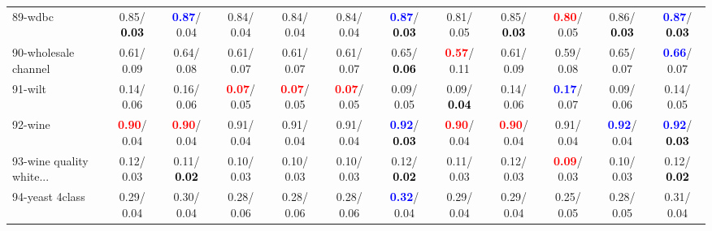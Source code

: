\begin{table}[h]
\begin{center}
{\begin{tabular}{lc|c|c|c|c|c|c|c|c|c|c}
89-wdbc &   0.85/\textcolor{black}{\textbf{  0.03}} & \textcolor{blue}{\textbf{  0.87}}/  0.04 &   0.84/  0.04 &   0.84/  0.04 &   0.84/  0.04 & \textcolor{blue}{\textbf{  0.87}}/\textcolor{black}{\textbf{  0.03}} &   0.81/  0.05 &   0.85/\textcolor{black}{\textbf{  0.03}} & \textcolor{red}{\textbf{  0.80}}/  0.05 &   0.86/\textcolor{black}{\textbf{  0.03}} & \textcolor{blue}{\textbf{  0.87}}/\textcolor{black}{\textbf{  0.03}} \\
90-wholesale channel &   0.61/  0.09 &   0.64/  0.08 &   0.61/  0.07 &   0.61/  0.07 &   0.61/  0.07 &   0.65/\textcolor{black}{\textbf{  0.06}} & \textcolor{red}{\textbf{  0.57}}/  0.11 &   0.61/  0.09 &   0.59/  0.08 &   0.65/  0.07 & \textcolor{blue}{\textbf{  0.66}}/  0.07 \\
91-wilt &   0.14/  0.06 &   0.16/  0.06 & \textcolor{red}{\textbf{  0.07}}/  0.05 & \textcolor{red}{\textbf{  0.07}}/  0.05 & \textcolor{red}{\textbf{  0.07}}/  0.05 &   0.09/  0.05 &   0.09/\textcolor{black}{\textbf{  0.04}} &   0.14/  0.06 & \textcolor{blue}{\textbf{  0.17}}/  0.07 &   0.09/  0.06 &   0.14/  0.05 \\
92-wine & \textcolor{red}{\textbf{  0.90}}/  0.04 & \textcolor{red}{\textbf{  0.90}}/  0.04 &   0.91/  0.04 &   0.91/  0.04 &   0.91/  0.04 & \textcolor{blue}{\textbf{  0.92}}/\textcolor{black}{\textbf{  0.03}} & \textcolor{red}{\textbf{  0.90}}/  0.04 & \textcolor{red}{\textbf{  0.90}}/  0.04 &   0.91/  0.04 & \textcolor{blue}{\textbf{  0.92}}/  0.04 & \textcolor{blue}{\textbf{  0.92}}/\textcolor{black}{\textbf{  0.03}} \\ \hline
93-wine quality white... &   0.12/  0.03 &   0.11/\textcolor{black}{\textbf{  0.02}} &   0.10/  0.03 &   0.10/  0.03 &   0.10/  0.03 &   0.12/\textcolor{black}{\textbf{  0.02}} &   0.11/  0.03 &   0.12/  0.03 & \textcolor{red}{\textbf{  0.09}}/  0.03 &   0.10/  0.03 &   0.12/\textcolor{black}{\textbf{  0.02}} \\
94-yeast 4class &   0.29/  0.04 &   0.30/  0.04 &   0.28/  0.06 &   0.28/  0.06 &   0.28/  0.06 & \textcolor{blue}{\textbf{  0.32}}/  0.04 &   0.29/  0.04 &   0.29/  0.04 &   0.25/  0.05 &   0.28/  0.05 &   0.31/  0.04 \\\end{tabular}}\label{stratsALCKappa2a5NN}
\end{center}
\end{table}
